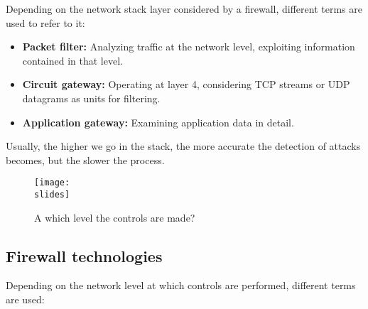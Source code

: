 Depending on the network stack layer considered by a firewall, different terms are used to refer to it:
\begin{itemize}
    \item \textbf{Packet filter:} Analyzing traffic at the network level, exploiting information contained in that level.
    \item \textbf{Circuit gateway:} Operating at layer 4, considering TCP streams or UDP datagrams as units for filtering.
    \item \textbf{Application gateway:} Examining application data in detail.
\end{itemize}

Usually, the higher we go in the stack, the more accurate the detection of attacks becomes, but the slower the process.

\begin{figure}[h]
    \centering
    \texttt{[image: \\slides]}
    \caption{A which level the controls are made?}
\end{figure}


\subsection{Firewall technologies}
Depending on the network level at which controls are performed, different terms are used:

